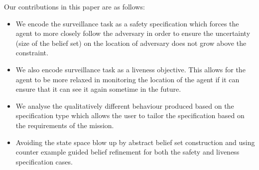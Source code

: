 Our contributions in this paper are as follows:
\begin{itemize}
\item We encode the surveillance task as a safety specification which forces the agent to more closely follow the adversary in order to ensure the uncertainty (size of the belief set) on the location of adversary does not grow above the constraint.
\item We also encode surveillance task as a liveness objective. This allows for the agent to be more relaxed in monitoring the location of the agent if it can ensure that it can see it again sometime in the future.
\item We analyse the qualitatively different behaviour produced based on the specification type which allows the user to tailor the specification based on the requirements of the mission.
\item Avoiding the state space blow up by abstract belief set construction and using counter example guided belief refinement for both the safety and liveness specification cases.
\end{itemize}

